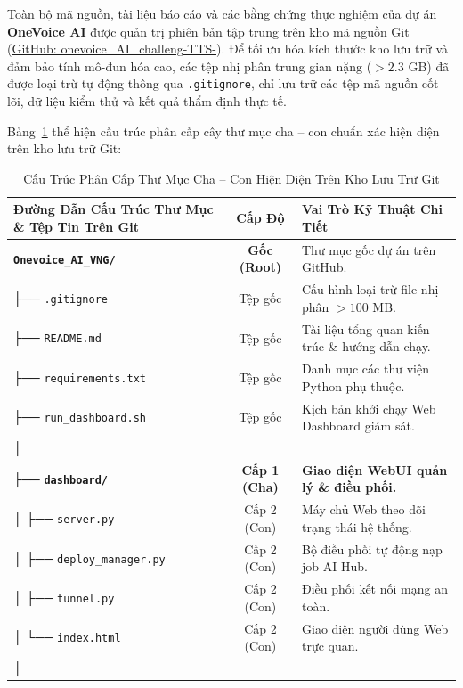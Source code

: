 \documentclass[11pt,a4paper,oneside,table]{report}
\begin{document}
Toàn bộ mã nguồn, tài liệu báo cáo và các bằng chứng thực nghiệm của dự án \textbf{OneVoice AI} được quản trị phiên bản tập trung trên kho mã nguồn Git (\href{https://github.com/pckhoa206/onevoice_AI_challeng-TTS-}{GitHub: onevoice\_AI\_challeng-TTS-}). Để tối ưu hóa kích thước kho lưu trữ và đảm bảo tính mô-đun hóa cao, các tệp nhị phân trung gian nặng ($>2.3\text{ GB}$) đã được loại trừ tự động thông qua \texttt{.gitignore}, chỉ lưu trữ các tệp mã nguồn cốt lõi, dữ liệu kiểm thử và kết quả thẩm định thực tế.

Bảng~\ref{tab:git_folder_hierarchy} thể hiện cấu trúc phân cấp cây thư mục cha -- con chuẩn xác hiện diện trên kho lưu trữ Git:

\begin{table}[H]
\centering
\small
\sffamily
\caption{Cấu Trúc Phân Cấp Thư Mục Cha -- Con Hiện Diện Trên Kho Lưu Trữ Git}
\label{tab:git_folder_hierarchy}
\vspace{2mm}
\begin{tabularx}{\textwidth}{p{7.2cm} c p{6.8cm}}
\toprule
\textbf{Đường Dẫn Cấu Trúc Thư Mục \& Tệp Tin Trên Git} & \textbf{Cấp Độ} & \textbf{Vai Trò Kỹ Thuật Chi Tiết} \\
\midrule
\textbf{\texttt{Onevoice\_AI\_VNG/}} & \textbf{Gốc (Root)} & Thư mục gốc dự án trên GitHub. \\
├── \texttt{.gitignore} & Tệp gốc & Cấu hình loại trừ file nhị phân $>100\text{ MB}$. \\
├── \texttt{README.md} & Tệp gốc & Tài liệu tổng quan kiến trúc \& hướng dẫn chạy. \\
├── \texttt{requirements.txt} & Tệp gốc & Danh mục các thư viện Python phụ thuộc. \\
├── \texttt{run\_dashboard.sh} & Tệp gốc & Kịch bản khởi chạy Web Dashboard giám sát. \\
│ & & \\
├── \textbf{\texttt{dashboard/}} & \textbf{Cấp 1 (Cha)} & \textbf{Giao diện WebUI quản lý \& điều phối.} \\
│   ├── \texttt{server.py} & Cấp 2 (Con) & Máy chủ Web theo dõi trạng thái hệ thống. \\
│   ├── \texttt{deploy\_manager.py} & Cấp 2 (Con) & Bộ điều phối tự động nạp job AI Hub. \\
│   ├── \texttt{tunnel.py} & Cấp 2 (Con) & Điều phối kết nối mạng an toàn. \\
│   └── \texttt{index.html} & Cấp 2 (Con) & Giao diện người dùng Web trực quan. \\
│ & & \\

\end{tabularx}
\end{table}
\end{document}
